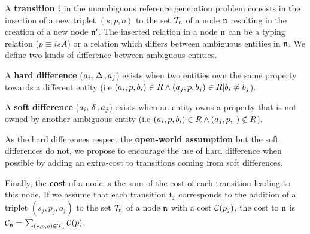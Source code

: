 \documentclass[a4paper,11pt,twoside]{StyleThese}
\begin{document}
A \textbf{transition} $\mathfrak{t}$ in the unambiguous reference generation problem consists in the insertion of a new triplet $(s, p, o)$ to the set $\mathcal{T}_{\mathfrak{n}}$ of a node $\mathfrak{n}$ resulting in the creation of a new node $\mathfrak{n}'$. The inserted relation in a node $\mathfrak{n}$ can be a typing relation ($p \equiv isA$) or a relation which differs between ambiguous entities in $\mathfrak{n}$. 
We define two kinds of difference between ambiguous entities.
\begin{definition}
A \textbf{hard difference} ($a_i, \,\Delta\,, a_j$) exists when two entities own the same property towards a different entity (i.e $(a_i, p, b_i) \in R \land (a_j, p, b_j) \in R | b_i \neq b_j$).
\end{definition}

\begin{definition}
A \textbf{soft difference} ($a_i, \,\delta\,, a_j$) exists when an entity owns a property that is not owned by another ambiguous entity (i.e $(a_i, p, b_i) \in R \land (a_j, p, \cdot) \notin R$).
\end{definition}


As the hard differences respect the \textbf{open-world assumption} but the soft differences do not, we propose to encourage the use of hard difference when possible by adding an extra-cost to transitions coming from soft differences.

Finally, the \textbf{cost} of a node is the sum of the cost of each transition leading to this node. If we assume that each transition $\mathfrak{t}_j$ corresponds to the addition of a triplet $(s_j, p_j, o_j)$ to the set $\mathcal{T}_{\mathfrak{n}}$ of a node $\mathfrak{n}$ with a cost $\mathcal{C}(p_j)$, the cost to $\mathfrak{n}$ is $\mathcal{C}_{\mathfrak{n}} = \sum_{(s, p, o) \in \mathcal{T}_{\mathfrak{n}}} \mathcal{C}(p)$. 
\end{document}
